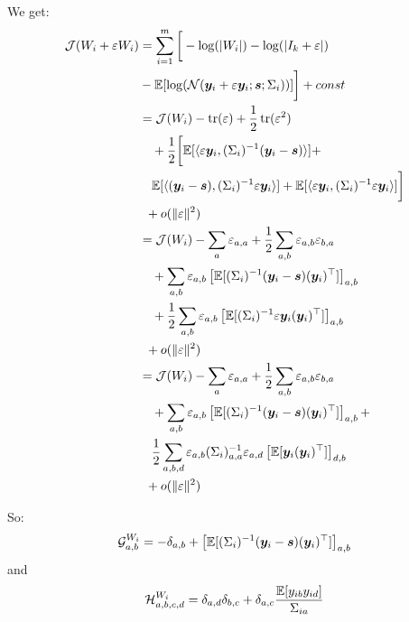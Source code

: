  We get:
 \begin{align}
   \mathcal{J}(W_i + \varepsilon W_i) &= \sum_{i=1}^m \bigg[ -\log(|W_i|) -\log(|I_k + \varepsilon|) \nonumber \\&- \mathbb{E}[\log(\mathcal{N}(\boldsymbol{y}_i + \varepsilon \boldsymbol{y}_i; \boldsymbol{s}; \Sigma_i))] \bigg] + const \\
                                      &= \mathcal{J}(W_i) - \mathop{\mathrm{tr}}(\varepsilon) + \frac12 \mathop{\mathrm{tr}}(\varepsilon^2) \nonumber \\& \enspace \enspace + \frac12 \bigg[\mathbb{E}[\langle{ \varepsilon \boldsymbol{y}_i},{ (\Sigma_i)^{-1} (\boldsymbol{y}_i - \boldsymbol{s}) }\rangle] + \nonumber \\& \enspace \enspace \mathbb{E}[\langle{ (\boldsymbol{y}_i - \boldsymbol{s})},{ (\Sigma_i)^{-1} \varepsilon \boldsymbol{y}_i }\rangle] + \mathbb{E}[\langle{ \varepsilon \boldsymbol{y}_i},{ (\Sigma_i)^{-1} \varepsilon \boldsymbol{y}_i }\rangle] \bigg] \nonumber \\ & \enspace + o(\|\varepsilon\|^2) \\
                                      &= \mathcal{J}(W_i) - \sum_a \varepsilon_{a, a} + \frac12 \sum_{a, b} \varepsilon_{a,b} \varepsilon_{b, a} \nonumber \\& \enspace \enspace + \sum_{a, b} \varepsilon_{a, b} \left[\mathbb{E}[(\Sigma_i)^{-1}(\boldsymbol{y}_i - \boldsymbol{s}) (\boldsymbol{y}_i)^{\top}] \right]_{a, b} \nonumber \\& \enspace \enspace + \frac12 \sum_{a, b} \varepsilon_{a, b} \left[\mathbb{E}[(\Sigma_i)^{-1} \varepsilon \boldsymbol{y}_i (\boldsymbol{y}_i)^{\top}]\right]_{a, b} \nonumber \\ & \enspace + o(\|\varepsilon\|^2) \\
                                      &= \mathcal{J}(W_i) - \sum_a \varepsilon_{a, a} + \frac12 \sum_{a, b} \varepsilon_{a,b} \varepsilon_{b, a} \nonumber \\& \enspace \enspace + \sum_{a, b} \varepsilon_{a, b} \left[\mathbb{E}[(\Sigma_i)^{-1}(\boldsymbol{y}_i - \boldsymbol{s}) (\boldsymbol{y}_i)^{\top}] \right]_{a, b} + \nonumber \\& \enspace \enspace \frac12 \sum_{a, b, d} \varepsilon_{a, b} (\Sigma_i)^{-1}_{a, a} \varepsilon_{a, d} \left[\mathbb{E}[\boldsymbol{y}_i (\boldsymbol{y}_i)^{\top}]\right]_{d, b} \nonumber \\ & \enspace + o(\|\varepsilon\|^2)
 \end{align}

 So:
 \begin{equation}
 \mathcal{G}^{W_i}_{a, b} =  -\delta_{a,b} + \left[\mathbb{E}[(\Sigma_i)^{-1} (\boldsymbol{y}_i - \boldsymbol{s})(\boldsymbol{y}_i)^{\top}]\right]_{a, b}
 \end{equation}
 and
 \begin{equation}
 \mathcal{H}^{W_i}_{a, b, c, d} = \delta_{a, d}\delta_{b, c} + \delta_{a, c} \frac{\mathbb{E}[y_{ib} y_{id}]}{\Sigma_{ia}}
 \end{equation}
 
